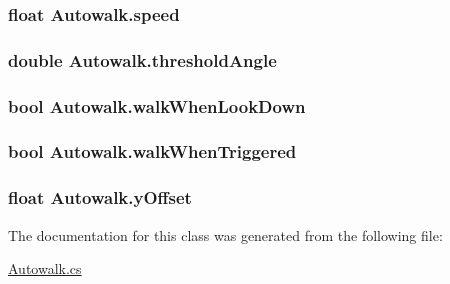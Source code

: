 \subsubsection[{speed}]{\setlength{\rightskip}{0pt plus 5cm}float Autowalk.\+speed}\label{class_autowalk_a3092a4d8988a54c5774865800cef6c22}
\hypertarget{class_autowalk_a88a1c42da0a6619e6f5540b1ff823e2a}{}
\subsubsection[{threshold\+Angle}]{\setlength{\rightskip}{0pt plus 5cm}double Autowalk.\+threshold\+Angle}\label{class_autowalk_a88a1c42da0a6619e6f5540b1ff823e2a}
\hypertarget{class_autowalk_aa93343a7a4e1f3884c91cbbe7cdfea1f}{}
\subsubsection[{walk\+When\+Look\+Down}]{\setlength{\rightskip}{0pt plus 5cm}bool Autowalk.\+walk\+When\+Look\+Down}\label{class_autowalk_aa93343a7a4e1f3884c91cbbe7cdfea1f}
\hypertarget{class_autowalk_ac644a9b75f6f5ace1155fd461ba7afc5}{}
\subsubsection[{walk\+When\+Triggered}]{\setlength{\rightskip}{0pt plus 5cm}bool Autowalk.\+walk\+When\+Triggered}\label{class_autowalk_ac644a9b75f6f5ace1155fd461ba7afc5}
\hypertarget{class_autowalk_a65b75b93ffed0edfd3fdf00b2f03fcc6}{}
\subsubsection[{y\+Offset}]{\setlength{\rightskip}{0pt plus 5cm}float Autowalk.\+y\+Offset}\label{class_autowalk_a65b75b93ffed0edfd3fdf00b2f03fcc6}


The documentation for this class was generated from the following file\+:\begin{DoxyCompactItemize}
\item 
\hyperlink{_autowalk_8cs}{Autowalk.\+cs}\end{DoxyCompactItemize}
